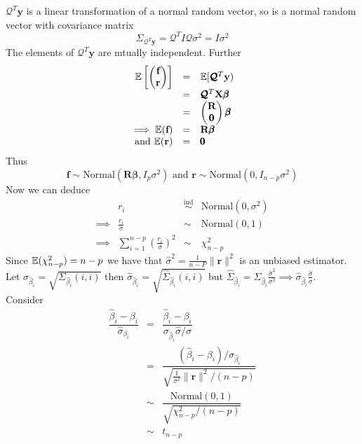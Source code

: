 \documentclass[11pt,a4paper]{article}
\begin{document}

$\pmb{\mathcal{Q}}^T\textbf{y}$ is a linear transformation of a normal random vector, so is a normal random vector with covariance matrix
$$\Sigma_{\pmb{\mathcal{Q}}^T\textbf{y}}=\pmb{\mathcal{Q}}^TI\pmb{\mathcal{Q}}\sigma^2=I\sigma^2$$
The elements of $\pmb{\mathcal{Q}}^T\textbf{y}$ are mtually independent. Further
\[\begin{array}{rcl}
\mathbb{E}\left[\begin{pmatrix}\textbf{f}\\\textbf{r}\end{pmatrix}\right]&=&\mathbb{E}[\pmb{\mathcal{Q}}^T\textbf{y})\\
&=&\pmb{\mathcal{Q}}^T\textbf{X}\pmb\beta\\
&=&\begin{pmatrix}\textbf{R}\\\pmb0\end{pmatrix}\pmb\beta\\
\implies\mathbb{E}(\textbf{f})&=&\textbf{R}\pmb\beta\\
\text{and }\mathbb{E}(\textbf{r})&=&\pmb0
\end{array}\]
Thus
$$\textbf{f}\sim\text{Normal}(\textbf{R}\pmb\beta,I_p\sigma^2)\text{ and }\textbf{r}\sim\text{Normal}(0,I_{n-p}\sigma^2)$$
Now we can deduce
\[\begin{array}{rrcl}
&r_i&\overset{\text{ind}}{\sim}&\text{Normal}(0,\sigma^2)\\
\implies&\frac{r_i}{\sigma}&\sim&\text{Normal}(0,1)\\
\implies&\displaystyle{\sum_{i=1}^{n-p}\left(\frac{r_i}{\sigma}\right)^2}&\sim&\chi^2_{n-p}
\end{array}\]
Since $\mathbb{E}(\chi^2_{n-p})=n-p$ we have that $\hat\sigma^2=\frac1{n-P}\|\textbf{r}\|^2$ is an unbiased estimator.\\
Let $\sigma_{\hat\beta_i}=\sqrt{\Sigma_{\hat\beta_i}(i,i)}$ then $\hat\sigma_{\hat\beta_i}=\sqrt{\hat\Sigma_{\hat\beta_i}(i,i)}$ but $\hat\Sigma_{\hat\beta_i}=\Sigma_{\hat\beta_i}\frac{\hat\sigma^2}{\sigma^2}\implies\hat\sigma_{\hat\beta_i}\frac{\hat\sigma}{\sigma}$.\\
Consider
\[\begin{array}{rcl}
\dfrac{\hat\beta_i-\beta_i}{\hat\sigma_{\beta_i}}&=&\dfrac{\hat\beta_i-\beta_i}{\sigma_{\hat\beta_i}\hat\sigma/\sigma}\\
&=&\dfrac{(\hat\beta_i-\beta_i)/\sigma_{\hat\beta_i}}{\sqrt{\frac1{\sigma^2}\|\textbf{r}\|^2/(n-p)}}\\
&\sim&\dfrac{\text{Normal}(0,1)}{\sqrt{\chi^2_{n-p}/(n-p)}}\\
&\sim&t_{n-p}
\end{array}\]
\end{document}
